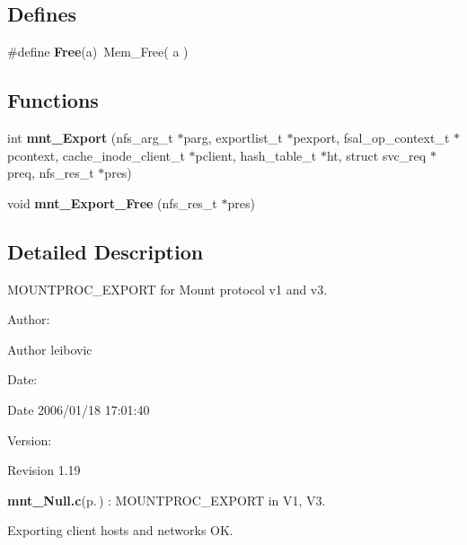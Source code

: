 \subsection*{Defines}
\begin{CompactItemize}
\item 
\#define {\bf Free}(a)\ Mem\_\-Free( a )
\end{CompactItemize}
\subsection*{Functions}
\begin{CompactItemize}
\item 
int {\bf mnt\_\-Export} (nfs\_\-arg\_\-t $\ast$parg, exportlist\_\-t $\ast$pexport, fsal\_\-op\_\-context\_\-t $\ast$pcontext, cache\_\-inode\_\-client\_\-t $\ast$pclient, hash\_\-table\_\-t $\ast$ht, struct svc\_\-req $\ast$preq, nfs\_\-res\_\-t $\ast$pres)
\item 
void {\bf mnt\_\-Export\_\-Free} (nfs\_\-res\_\-t $\ast$pres)
\end{CompactItemize}


\subsection{Detailed Description}
MOUNTPROC\_\-EXPORT for Mount protocol v1 and v3. 

\begin{Desc}
\item[Author:]\begin{Desc}
\item[Author]leibovic \end{Desc}
\end{Desc}
\begin{Desc}
\item[Date:]\begin{Desc}
\item[Date]2006/01/18 17:01:40 \end{Desc}
\end{Desc}
\begin{Desc}
\item[Version:]\begin{Desc}
\item[Revision]1.19 \end{Desc}
\end{Desc}
{\bf mnt\_\-Null.c}{\rm (p.\,\pageref{mnt__Null_8c})} : MOUNTPROC\_\-EXPORT in V1, V3.

Exporting client hosts and networks OK.

